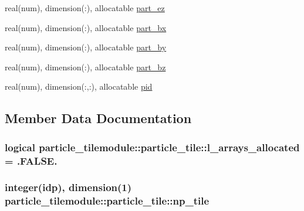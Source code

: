 \begin{DoxyCompactItemize}
\item 
real(num), dimension(\+:), allocatable \hyperlink{structparticle__tilemodule_1_1particle__tile_a740d23290e96e4a53274b5b3c8a89ad5}{part\+\_\+ez}
\item 
real(num), dimension(\+:), allocatable \hyperlink{structparticle__tilemodule_1_1particle__tile_ad8a84455eb85604aa3da6a014a7466b2}{part\+\_\+bx}
\item 
real(num), dimension(\+:), allocatable \hyperlink{structparticle__tilemodule_1_1particle__tile_aa160fdc363e23d99d9f8ce4f91e2b9c9}{part\+\_\+by}
\item 
real(num), dimension(\+:), allocatable \hyperlink{structparticle__tilemodule_1_1particle__tile_ab01f2c34869ddae859b05b0827b93bb0}{part\+\_\+bz}
\item 
real(num), dimension(\+:,\+:), allocatable \hyperlink{structparticle__tilemodule_1_1particle__tile_a6237c34ee3dedb0b664c5bc174ddc7e8}{pid}
\end{DoxyCompactItemize}


\subsection{Member Data Documentation}
\subsubsection[{\texorpdfstring{l\+\_\+arrays\+\_\+allocated}{l_arrays_allocated}}]{\setlength{\rightskip}{0pt plus 5cm}logical particle\+\_\+tilemodule\+::particle\+\_\+tile\+::l\+\_\+arrays\+\_\+allocated = .F\+A\+L\+S\+E.}\hypertarget{structparticle__tilemodule_1_1particle__tile_ac7e7825b8309e0cd4df8123cccdb2762}{}\label{structparticle__tilemodule_1_1particle__tile_ac7e7825b8309e0cd4df8123cccdb2762}
\subsubsection[{\texorpdfstring{np\+\_\+tile}{np_tile}}]{\setlength{\rightskip}{0pt plus 5cm}integer(idp), dimension(1) particle\+\_\+tilemodule\+::particle\+\_\+tile\+::np\+\_\+tile}\hypertarget{structparticle__tilemodule_1_1particle__tile_ab9bcba3f2500e14759770e22962bfa95}{}\label{structparticle__tilemodule_1_1particle__tile_ab9bcba3f2500e14759770e22962bfa95}
